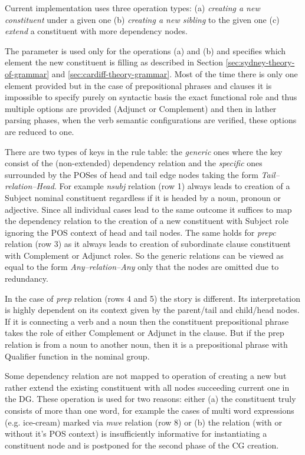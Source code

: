 Current implementation uses three operation types: (a) \textit{creating a new constituent} under a given  one (b) \textit{creating a new sibling} to the given one (c) \textit{extend} a constituent with more dependency nodes. 

The parameter is used only for the operations (a) and (b) and specifies which element the new constituent is filling as described in Section \ref{sec:sydney-theory-of-grammar} and \ref{sec:cardiff-theory-grammar}. Most of the time there is only one element provided but in the case of prepositional phrases and clauses it is impossible to specify purely on syntactic basis the exact functional role and thus multiple options are provided (Adjunct or Complement) and then in lather parsing phases, when the verb semantic configurations are verified, these options are reduced to one.  

There are two types of keys in the rule table: the \textit{generic} ones where the key consist of the (non-extended) dependency relation and the \textit{specific} ones surrounded by the POSes of head and tail edge nodes taking the form \mbox{\textit{Tail--relation--Head}}. For example \textit{nsubj} relation (row 1) always leads to creation of a Subject nominal constituent regardless if it is headed by a noun, pronoun or adjective. Since all individual cases lead to the same outcome it suffices to map the dependency relation to the creation of a new constituent with Subject role ignoring the POS context of head and tail nodes. The same holds for \textit{prepc} relation (row 3) as it always leads to creation of subordinate clause constituent with Complement or Adjunct roles. So the generic relations can be viewed as equal to the form \mbox{\textit{Any--relation--Any}} only that the nodes are omitted due to redundancy.

In the case of \textit{prep} relation (rows 4 and 5) the story is different. Its interpretation is highly dependent on its context given by the parent/tail and child/head nodes. If it is connecting a verb and a noun then the constituent prepositional phrase takes the role of either Complement or Adjunct in the clause. But if the prep relation is from a noun to another noun, then it is a prepositional phrase with Qualifier function in the nominal group.

Some dependency relation are not mapped to operation of creating a new but rather extend the existing constituent with all nodes succeeding current one in the DG. These operation is used for two reasons: either (a) the constituent truly consists of more than one word, for example the cases of multi word expressions (e.g. ice-cream) marked via \textit{mwe} relation (row 8) or (b) the relation (with or without it's POS context) is insufficiently informative for instantiating a constituent node and is postponed for the second phase of the CG creation.

